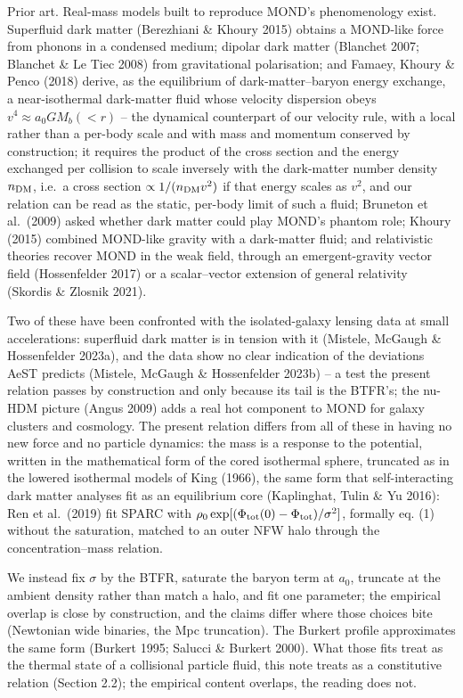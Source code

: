 \documentclass[
  10pt,
]{article}
\begin{document}
Prior art. Real-mass models built to reproduce MOND's phenomenology exist. Superfluid dark matter (Berezhiani \& Khoury 2015) obtains a MOND-like force from phonons in a condensed medium; dipolar dark matter (Blanchet 2007; Blanchet \& Le Tiec 2008) from gravitational polarisation; and Famaey, Khoury \& Penco (2018) derive, as the equilibrium of dark-matter--baryon energy exchange, a near-isothermal dark-matter fluid whose velocity dispersion obeys $v^4\approx a_0GM_b(<r)$ -- the dynamical counterpart of our velocity rule, with a local rather than a per-body scale and with mass and momentum conserved by construction; it requires the product of the cross section and the energy exchanged per collision to scale inversely with the dark-matter number density $n_{\rm DM}$, i.e.\ a cross section $\propto1/(n_{\rm DM}v^2)$ if that energy scales as $v^2$, and our relation can be read as the static, per-body limit of such a fluid; Bruneton et al.~(2009) asked whether dark matter could play MOND's phantom role; Khoury (2015) combined MOND-like gravity with a dark-matter fluid; and relativistic theories recover MOND in the weak field, through an emergent-gravity vector field (Hossenfelder 2017) or a scalar--vector extension of general relativity (Skordis \& Zlosnik 2021).

Two of these have been confronted with the isolated-galaxy lensing data at small accelerations: superfluid dark matter is in tension with it (Mistele, McGaugh \& Hossenfelder 2023a), and the data show no clear indication of the deviations AeST predicts (Mistele, McGaugh \& Hossenfelder 2023b) -- a test the present relation passes by construction and only because its tail is the BTFR's; the nu-HDM picture (Angus 2009) adds a real hot component to MOND for galaxy clusters and cosmology. The present relation differs from all of these in having no new force and no particle dynamics: the mass is a response to the potential, written in the mathematical form of the cored isothermal sphere, truncated as in the lowered isothermal models of King (1966), the same form that self-interacting dark matter analyses fit as an equilibrium core (Kaplinghat, Tulin \& Yu 2016): Ren et al.~(2019) fit SPARC with $\rho_0\exp[(\Phi_{\rm tot}(0)-\Phi_{\rm tot})/\sigma^2]$, formally eq. (1) without the saturation, matched to an outer NFW halo through the concentration--mass relation.

We instead fix $\sigma$ by the BTFR, saturate the baryon term at $a_0$, truncate at the ambient density rather than match a halo, and fit one parameter; the empirical overlap is close by construction, and the claims differ where those choices bite (Newtonian wide binaries, the Mpc truncation). The Burkert profile approximates the same form (Burkert 1995; Salucci \& Burkert 2000). What those fits treat as the thermal state of a collisional particle fluid, this note treats as a constitutive relation (Section 2.2); the empirical content overlaps, the reading does not.
\end{document}
